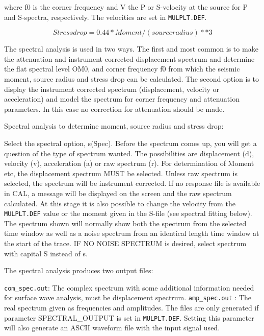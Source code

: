 where f0 is the corner frequency and V the P or S-velocity at the source for P and S-spectra, respectively. The velocities are set in \texttt{MULPLT.DEF}. 

\begin{displaymath}
Stress drop = 0.44 * Moment /(source radius)**3
\end{displaymath}

 The spectral analysis is used in two ways. The first and most common is to make the attenuation and instrument corrected displacement spectrum and determine the flat spectral level OM0, and corner frequency f0 from which the seismic moment, source radius and stress drop can be calculated. The second option is to display the instrument corrected spectrum (displacement, velocity or acceleration) and model the spectrum for corner frequency and attenuation parameters. In this case no correction for attenuation should be made. 

Spectral analysis to determine moment, source radius and stress drop: 

Select the spectral option, s(Spec). Before the spectrum comes up, you will get a question of the type of spectrum wanted. The possibilities are displacement (d), velocity (v), acceleration (a) or raw spectrum (r). For determination of Moment etc, the displacement spectrum MUST be selected. Unless raw spectrum is selected, the spectrum will be instrument corrected. If no response file is available in CAL, a message will be displayed on the screen and the raw spectrum calculated. At this stage it is also possible to change the velocity from the \texttt{MULPLT.DEF} value or the moment given in the S-file (see spectral fitting below). The spectrum shown will normally show both the spectrum from the selected time window as well as a noise spectrum from an identical length time window at the start of the trace. IF NO NOISE SPECTRUM is desired, select spectrum with capital S instead of s.   

The spectral analysis produces two output files: 

\texttt{com\_spec.out}: The complex spectrum with some additional information 
needed for surface wave analysis, must 
be displacement spectrum.\newline
\texttt{amp\_spec.out} : The real spectrum given as frequencies and amplitudes. 
The files are only generated if parameter SPECTRAL\_OUTPUT is set 
in \texttt{MULPLT.DEF}. Setting this parameter will also generate 
an ASCII waveform file with the input signal used. 

